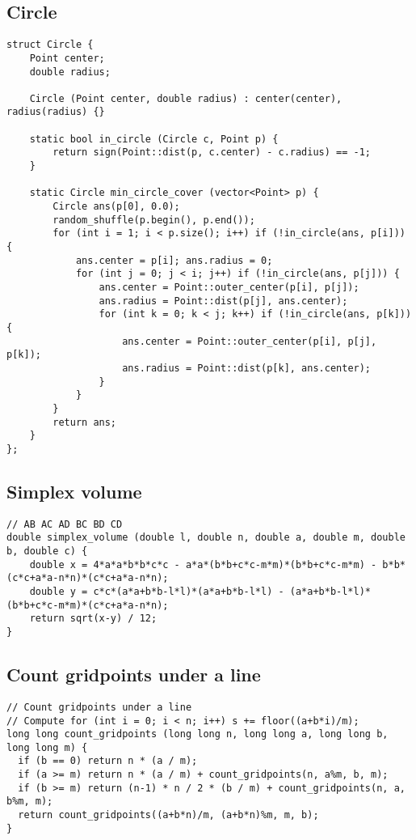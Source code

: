 \documentclass[10pt,landscape]{article}
\begin{document}
\begin{multicols}{2}
\subsection{Circle}
\begin{lstlisting}
struct Circle {
	Point center;
	double radius;

	Circle (Point center, double radius) : center(center), radius(radius) {}

	static bool in_circle (Circle c, Point p) {
		return sign(Point::dist(p, c.center) - c.radius) == -1;
	}

	static Circle min_circle_cover (vector<Point> p) {
		Circle ans(p[0], 0.0);
		random_shuffle(p.begin(), p.end());
		for (int i = 1; i < p.size(); i++) if (!in_circle(ans, p[i])) {
			ans.center = p[i]; ans.radius = 0;
			for (int j = 0; j < i; j++) if (!in_circle(ans, p[j])) {
				ans.center = Point::outer_center(p[i], p[j]);
				ans.radius = Point::dist(p[j], ans.center);
				for (int k = 0; k < j; k++) if (!in_circle(ans, p[k])) {
					ans.center = Point::outer_center(p[i], p[j], p[k]);
					ans.radius = Point::dist(p[k], ans.center);
				}
			}
		}
		return ans;
	}
};
\end{lstlisting}
\subsection{Simplex volume}
\begin{lstlisting}
// AB AC AD BC BD CD
double simplex_volume (double l, double n, double a, double m, double b, double c) {
	double x = 4*a*a*b*b*c*c - a*a*(b*b+c*c-m*m)*(b*b+c*c-m*m) - b*b*(c*c+a*a-n*n)*(c*c+a*a-n*n);
	double y = c*c*(a*a+b*b-l*l)*(a*a+b*b-l*l) - (a*a+b*b-l*l)*(b*b+c*c-m*m)*(c*c+a*a-n*n);
	return sqrt(x-y) / 12;
}
\end{lstlisting}
\subsection{Count gridpoints under a line}
\begin{lstlisting}
// Count gridpoints under a line
// Compute for (int i = 0; i < n; i++) s += floor((a+b*i)/m);
long long count_gridpoints (long long n, long long a, long long b, long long m) {
  if (b == 0) return n * (a / m);
  if (a >= m) return n * (a / m) + count_gridpoints(n, a%m, b, m);
  if (b >= m) return (n-1) * n / 2 * (b / m) + count_gridpoints(n, a, b%m, m);
  return count_gridpoints((a+b*n)/m, (a+b*n)%m, m, b);
}
\end{lstlisting}

\end{multicols}
\end{document}
